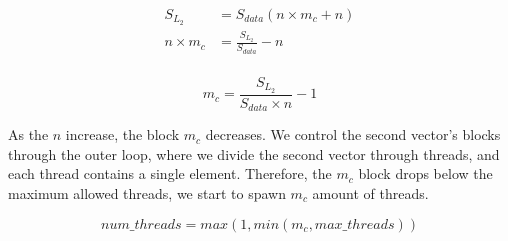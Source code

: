 \begin{align*}
    S_{L_2} &= S_{data}(n \times m_c + n)\\
    n \times m_c &= \frac{S_{L_2}}{S_{data}} - n\\
\end{align*}

\begin{equation}
    m_c = \frac{S_{L_2}}{S_{data} \times n} - 1
    \label{eq:outer_block}
\end{equation}

As the $n$ increase, the block $m_c$ decreases. 
We control the second vector's blocks through the outer loop, 
where we divide the second vector through threads, and each 
thread contains a single element. Therefore, 
the $m_c$ block drops below the maximum allowed threads, 
we start to spawn $m_c$ amount of threads.

\begin{equation}
    num\_threads = max(1, min(m_c,max\_threads)) 
    \label{eq:outer_num_threads}
\end{equation}
